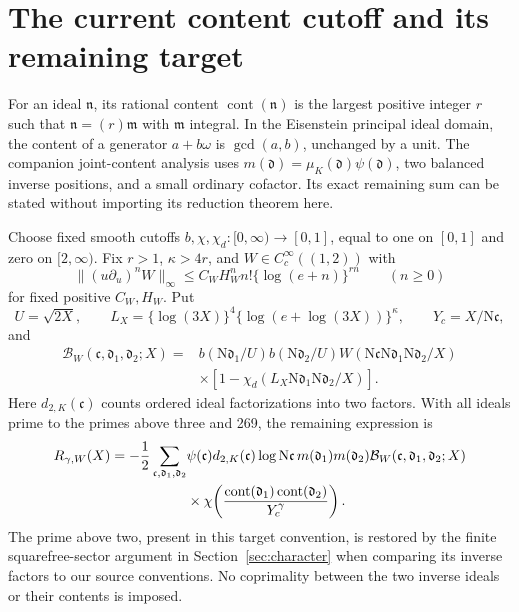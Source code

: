 \documentclass[11pt]{article}
\theoremstyle{remark}\newtheorem{remark}[theorem]{Remark}
\newcommand{\N}{\mathrm N}
\DeclareMathOperator{\cont}{cont}
\begin{document}
\section{The current content cutoff and its remaining target}\label{sec:content}

For an ideal $\mathfrak n$, its rational content $\cont(\mathfrak n)$ is the largest positive integer $r$ such that $\mathfrak n=(r)\mathfrak m$ with $\mathfrak m$ integral. In the Eisenstein principal ideal domain, the content of a generator $a+b\omega$ is $\gcd(a,b)$, unchanged by a unit. The companion joint-content analysis uses $m(\mathfrak d)=\mu_K(\mathfrak d)\psi(\mathfrak d)$, two balanced inverse positions, and a small ordinary cofactor. Its exact remaining sum can be stated without importing its reduction theorem here.

Choose fixed smooth cutoffs $b,\chi,\chi_d:[0,\infty)\to[0,1]$, equal to one on $[0,1]$ and zero on $[2,\infty)$. Fix $r>1$, $\kappa>4r$, and $W\in C_c^\infty((1,2))$ with
\[
\|(u\partial_u)^nW\|_\infty
\le C_WH_W^n n!\{\log(e+n)\}^{rn}\qquad(n\ge0)
\]
for fixed positive $C_W,H_W$. Put
\[
U=\sqrt{2X},\qquad L_X=\{\log(3X)\}^4
\{\log(e+\log(3X))\}^{\kappa},\qquad Y_c=X/\N\mathfrak c,
\]
and
\begin{align*}
\mathcal B_W(\mathfrak c,\mathfrak d_1,\mathfrak d_2;X)
={}&b(\N\mathfrak d_1/U)b(\N\mathfrak d_2/U)
W(\N\mathfrak c\N\mathfrak d_1\N\mathfrak d_2/X)\\
&\times\left[1-\chi_d(L_X\N\mathfrak d_1\N\mathfrak d_2/X)\right].
\end{align*}
Here $d_{2,K}(\mathfrak c)$ counts ordered ideal factorizations into two factors. With all ideals prime to the primes above three and 269, the remaining expression is
\begin{align}
R_{\gamma,W}(X)=-\frac12\sum_{\mathfrak c,\mathfrak d_1,\mathfrak d_2}
&\psi(\mathfrak c)d_{2,K}(\mathfrak c)\log\N\mathfrak c\,
m(\mathfrak d_1)m(\mathfrak d_2)
\mathcal B_W(\mathfrak c,\mathfrak d_1,\mathfrak d_2;X)\notag\\
&\times\chi\!\left(\frac{\cont(\mathfrak d_1)\cont(\mathfrak d_2)}{Y_c^\gamma}\right).
\label{eq:target}
\end{align}
The prime above two, present in this target convention, is restored by the finite squarefree-sector argument in Section~\ref{sec:character} when comparing its inverse factors to our source conventions. No coprimality between the two inverse ideals or their contents is imposed.
\end{document}
